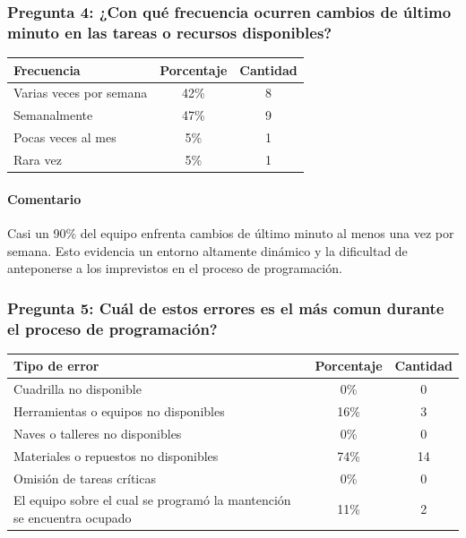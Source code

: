 \documentclass{article}
\begin{document}
\begin{appendix}
    
    \vspace{1.5em}
    \subsubsection*{Pregunta 4: ¿Con qué frecuencia ocurren cambios de último minuto en las tareas o recursos disponibles?}
    
    \begin{table}[htbp]
        \centering
        \begin{tabular}{lcc}
            \toprule
            \textbf{Frecuencia} & \textbf{Porcentaje} & \textbf{Cantidad} \\
            \midrule
            Varias veces por semana & 42\% & 8 \\
            Semanalmente & 47\% & 9 \\
            Pocas veces al mes & 5\% & 1 \\
            Rara vez & 5\% & 1 \\
            \bottomrule
        \end{tabular}
        \label{tab:cambios_ultimo_minuto}
    \end{table}
    
    \paragraph{Comentario} Casi un 90\% del equipo enfrenta cambios de último minuto al menos una vez por semana. Esto evidencia un entorno altamente dinámico y la dificultad de anteponerse a los imprevistos en el proceso de programación.
    
    
    \vspace{1.5em}
    \subsubsection*{Pregunta 5: Cuál de estos errores es el más comun durante el proceso de programación?}
    
    \begin{table}[htbp]
        \centering
        \begin{tabular}{p{7cm}cc}
            \toprule
            \textbf{Tipo de error} & \textbf{Porcentaje} & \textbf{Cantidad} \\
            \midrule
            Cuadrilla no disponible & 0\% & 0 \\
            Herramientas o equipos no disponibles & 16\% & 3 \\
            Naves o talleres no disponibles & 0\% & 0 \\
            Materiales o repuestos no disponibles & 74\% & 14 \\
            Omisión de tareas críticas & 0\% & 0 \\
            El equipo sobre el cual se programó la mantención se encuentra ocupado & 11\% & 2 \\
            \bottomrule
        \end{tabular}
        \label{tab:errores_comunes}
    \end{table}
    

\end{appendix}
\end{document}
